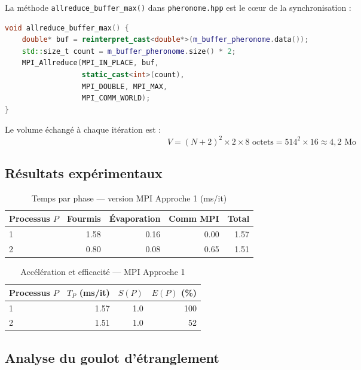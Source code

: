 La méthode \texttt{allreduce\_buffer\_max()} dans \texttt{pheronome.hpp} est le
cœur de la synchronisation :

\begin{lstlisting}[language=C++, caption={Synchronisation MPI des phéromones}]
void allreduce_buffer_max() {
    double* buf = reinterpret_cast<double*>(m_buffer_pheronome.data());
    std::size_t count = m_buffer_pheronome.size() * 2;
    MPI_Allreduce(MPI_IN_PLACE, buf,
                  static_cast<int>(count),
                  MPI_DOUBLE, MPI_MAX,
                  MPI_COMM_WORLD);
}
\end{lstlisting}

Le volume échangé à chaque itération est :
\[
    V = (N+2)^2 \times 2 \times 8 \text{ octets} = 514^2 \times 16 \approx 4{,}2 \text{ Mo}
\]

\subsection{Résultats expérimentaux}

\begin{table}[h]
\centering
\caption{Temps par phase — version MPI Approche 1 (ms/it)}
\label{tab:mpi_timing}
\begin{tabular}{lrrrr}
\hline
\textbf{Processus $P$} & \textbf{Fourmis} & \textbf{Évaporation} & \textbf{Comm MPI} & \textbf{Total} \\
\hline
1 & 1.58 & 0.16 & 0.00 & 1.57\footnotemark \\
2 & 0.80 & 0.08 & 0.65 & 1.51 \\
\hline
\end{tabular}
\end{table}

\begin{table}[h]
\centering
\caption{Accélération et efficacité — MPI Approche 1}
\label{tab:mpi_speedup}
\begin{tabular}{lrrr}
\hline
\textbf{Processus $P$} & \textbf{$T_P$ (ms/it)} & \textbf{$S(P)$} & \textbf{$E(P)$ (\%)} \\
\hline
1 & 1.57 & 1.0 & 100 \\
2 & 1.51 & 1.0 &  52 \\
\hline
\end{tabular}
\end{table}

\subsection{Analyse du goulot d'étranglement}

